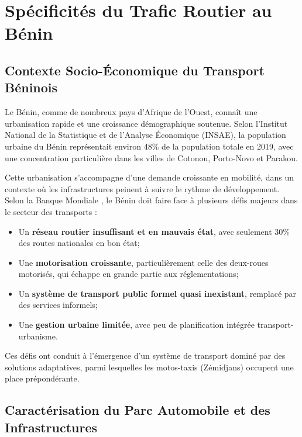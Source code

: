 \chapter{Spécificités du Trafic Routier au Bénin}
\label{chap:specificites_benin}

\section{Contexte Socio-Économique du Transport Béninois}
\label{sec:contexte_socio_economique}

Le Bénin, comme de nombreux pays d'Afrique de l'Ouest, connaît une urbanisation rapide et une croissance démographique soutenue. Selon l'Institut National de la Statistique et de l'Analyse Économique (INSAE), la population urbaine du Bénin représentait environ 48\% de la population totale en 2019, avec une concentration particulière dans les villes de Cotonou, Porto-Novo et Parakou.

Cette urbanisation s'accompagne d'une demande croissante en mobilité, dans un contexte où les infrastructures peinent à suivre le rythme de développement. Selon la Banque Mondiale \cite{worldbank2019benin}, le Bénin doit faire face à plusieurs défis majeurs dans le secteur des transports :

\begin{itemize}
\item Un \textbf{réseau routier insuffisant et en mauvais état}, avec seulement 30\% des routes nationales en bon état;
\item Une \textbf{motorisation croissante}, particulièrement celle des deux-roues motorisés, qui échappe en grande partie aux réglementations;
\item Un \textbf{système de transport public formel quasi inexistant}, remplacé par des services informels;
\item Une \textbf{gestion urbaine limitée}, avec peu de planification intégrée transport-urbanisme.
\end{itemize}

Ces défis ont conduit à l'émergence d'un système de transport dominé par des solutions adaptatives, parmi lesquelles les motos-taxis (Zémidjans) occupent une place prépondérante.

\section{Caractérisation du Parc Automobile et des Infrastructures}
\label{sec:parc_automobile}

